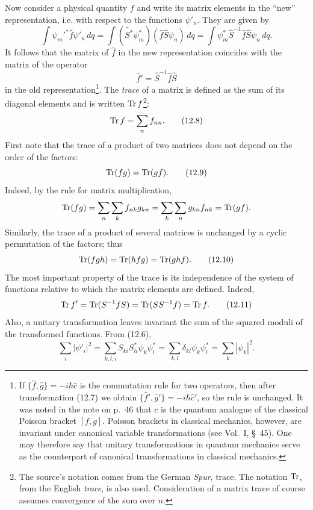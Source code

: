 Now consider a physical quantity $f$ and write its matrix elements in the
``new'' representation, i.e. with respect to the functions $\psi'_n$. They are
given by
\[
 \int\psi_m'^*\hat f\psi'_n\,dq
 =\int(\tilde{S^*}\psi_m^*)(\hat f\hat S\psi_n)\,dq
 =\int\psi_m^*\hat S^{-1}\hat f\hat S\psi_n\,dq.
\]
It follows that the matrix of $\hat f$ in the new representation coincides
with the matrix of the operator
\begin{equation}
  \hat f'=\hat S^{-1}\hat f\hat S
  \tag{12.7}
\end{equation}
in the old representation\footnote{If
$\{\hat f,\hat g\}=-i\hbar\hat c$ is the commutation rule for two operators,
then after transformation (12.7) we obtain
$\{\hat f',\hat g'\}=-i\hbar\hat c'$, so the rule is unchanged. It was noted
in the note on p.~46 that $c$ is the quantum analogue of the classical Poisson
bracket $[f,g]$. Poisson brackets in classical mechanics, however, are
invariant under canonical variable transformations (see Vol.~I, \S~45).
One may therefore say that unitary transformations in quantum mechanics
serve as the counterpart of
canonical transformations in classical mechanics.}.
The \textit{trace} of a matrix is defined as the sum of its diagonal elements
and is written $\operatorname{Tr} f$\footnote{The source's notation comes from the German
\textit{Spur}, trace. The notation $\operatorname{Tr}$, from the English
\textit{trace}, is also used. Consideration of a matrix trace of course assumes
convergence of the sum over $n$.}:
\begin{equation}
  \operatorname{Tr} f=\sum_n f_{nn}.
  \tag{12.8}
\end{equation}
First note that the trace of a product of two matrices does not depend on the
order of the factors:
\begin{equation}
  \operatorname{Tr}(fg)=\operatorname{Tr}(gf).
  \tag{12.9}
\end{equation}
Indeed, by the rule for matrix multiplication,
\[
 \operatorname{Tr}(fg)=\sum_n\sum_k f_{nk}g_{kn}
 =\sum_k\sum_n g_{kn}f_{nk}=\operatorname{Tr}(gf).
\]
Similarly, the trace of a product of several matrices is unchanged by a cyclic
permutation of the factors; thus
\begin{equation}
 \operatorname{Tr}(fgh)=\operatorname{Tr}(hfg)=\operatorname{Tr}(ghf).
 \tag{12.10}
\end{equation}
The most important property of the trace is its independence of the system of
functions relative to which the matrix elements are defined. Indeed,
\begin{equation}
 \operatorname{Tr} f'=\operatorname{Tr}(S^{-1}fS)=\operatorname{Tr}(SS^{-1}f)=\operatorname{Tr} f.
 \tag{12.11}
\end{equation}
Also, a unitary transformation leaves invariant the sum of the squared moduli
of the transformed functions. From (12.6),
\begin{equation}
 \sum_i|\psi'_i|^2
 =\sum_{k,l,i}S_{ki}S_{li}^*\psi_k\psi_l^*
 =\sum_{k,l}\delta_{kl}\psi_k\psi_l^*=\sum_k|\psi_k|^2.
 \tag{12.12}
\end{equation}

